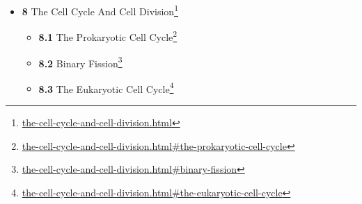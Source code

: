 \documentclass[
]{article}
\providecommand{\tightlist}{%
  \setlength{\itemsep}{0pt}\setlength{\parskip}{0pt}}
\providecommand{\tightlist}{%
  \setlength{\itemsep}{0pt}\setlength{\parskip}{0pt}}
\let\rmarkdownfootnote\footnote%
\def\footnote{\protect\rmarkdownfootnote}
\renewcommand{\href}[2]{#2\footnote{\url{#1}}}
\theoremstyle{definition}
\theoremstyle{definition}
\theoremstyle{definition}
\theoremstyle{remark}
\begin{document}
\begin{itemize}
\begin{itemize}
    \begin{itemize}
    \tightlist
    \item
      \href{photosynthesis-and-cellular-respiration.html\#aerobic-respiration}{\emph{}\textbf{7.5.1}
      Aerobic Respiration}
    \item
      \href{photosynthesis-and-cellular-respiration.html\#glycolysis}{\emph{}\textbf{7.5.2}
      Glycolysis}
    \item
      \href{photosynthesis-and-cellular-respiration.html\#oxidative-decarboxylation-of-pyruvate}{\emph{}\textbf{7.5.3}
      Oxidative Decarboxylation of Pyruvate}
    \item
      \href{photosynthesis-and-cellular-respiration.html\#the-citric-acid-cycle}{\emph{}\textbf{7.5.4}
      The Citric Acid Cycle}
    \item
      \href{photosynthesis-and-cellular-respiration.html\#oxidative-phosphorylation-1}{\emph{}\textbf{7.5.5}
      Oxidative Phosphorylation}
    \end{itemize}
  \item
    \href{photosynthesis-and-cellular-respiration.html\#fermentation}{\emph{}\textbf{7.6}
    Fermentation}
  \item
    \href{photosynthesis-and-cellular-respiration.html\#anaerobic-respiration}{\emph{}\textbf{7.7}
    Anaerobic Respiration}
  \end{itemize}
\item
  \href{the-cell-cycle-and-cell-division.html}{\emph{}\textbf{8} The
  Cell Cycle And Cell Division}

  \begin{itemize}
  \tightlist
  \item
    \href{the-cell-cycle-and-cell-division.html\#the-prokaryotic-cell-cycle}{\emph{}\textbf{8.1}
    The Prokaryotic Cell Cycle}
  \item
    \href{the-cell-cycle-and-cell-division.html\#binary-fission}{\emph{}\textbf{8.2}
    Binary Fission}
  \item
    \href{the-cell-cycle-and-cell-division.html\#the-eukaryotic-cell-cycle}{\emph{}\textbf{8.3}
    The Eukaryotic Cell Cycle}


\end{itemize}
\end{itemize}
\end{document}
